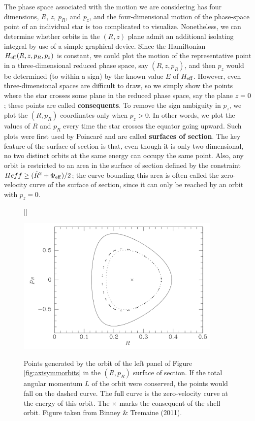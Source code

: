 \documentclass[a4paper,10pt]{article}
\begin{document}
{\noindent}The phase space associated with the motion we are considering has four dimensions, $R$, $z$, $p_R$, and $p_z$, and the four-dimensional motion of the phase-space point of an individual star is too complicated to visualize. Nonetheless, we can determine whether orbits in the $(R,z)$ plane admit an additional isolating integral by use of a simple graphical device. Since the Hamiltonian $H_{\rm eff}(R,z,p_R,p_z)$ is constant, we could plot the motion of the representative point in a three-dimensional reduced phase space, say $(R,z,p_R)$, and then $p_z$ would be determined (to within a sign) by the known value $E$ of $H_{\rm eff}$. However, even three-dimensional spaces are difficult to draw, so we simply show the points where the star crosses some plane in the reduced phase space, say the plane $z=0$; these points are called \textbf{consequents}. To remove the sign ambiguity in $p_z$, we plot the $(R,p_R)$ coordinates only when $p_z>0$. In other words, we plot the values of $R$ and $p_R$ every time the star crosses the equator going upward. Such plots were first used by Poincar\'e and are called \textbf{surfaces of section}. The key feature of the surface of section is that, even though it is only two-dimensional, no two distinct orbits at the same energy can occupy the same point. Also, any orbit is restricted to an area in the surface of section defined by the constraint $Heff\geq(\dot{R}^2+\Phi_{\rm eff})/2$; the curve bounding this area is often called the zero-velocity curve of the surface of section, since it can only be reached by an orbit with $p_z=0$.

\begin{figure}[t]
    [\FBwidth]
    {\caption{\footnotesize{Points generated by the orbit of the left panel of Figure \ref{fig:axisymmorbits} in the $(R,p_R)$ surface of section. If the total angular momentum $L$ of the orbit were conserved, the points would fall on the dashed curve. The full curve is the zero-velocity curve at the energy of this orbit. The $\times$ marks the consequent of the shell orbit. Figure taken from Binney \& Tremaine (2011).}}
    \label{fig:surfacesection}}
    {\includegraphics[width=10cm]{figures/SurfaceSection.png}}
\end{figure}
\end{document}
